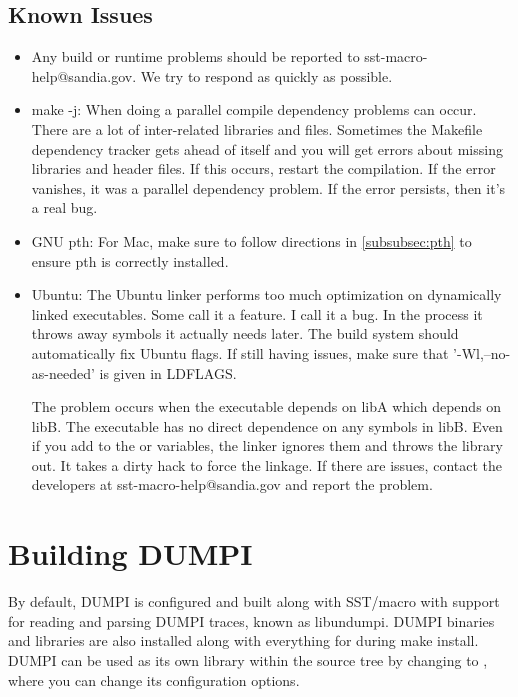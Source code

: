 \subsection{Known Issues}
\label{subsec:build:issues}


\begin{itemize}
\item Any build or runtime problems should be reported to sst-macro-help@sandia.gov.  We try to respond as quickly as possible.
\item make -j: When doing a parallel compile dependency problems can occur.  
There are a lot of inter-related libraries and files.  
Sometimes the Makefile dependency tracker gets ahead of itself and you will get errors about missing libraries and header files.
If this occurs, restart the compilation.  If the error vanishes, it was a parallel dependency problem.
If the error persists, then it's a real bug.
\item GNU pth: For Mac, make sure to follow directions in \ref{subsubsec:pth} to ensure pth is correctly installed.
\item Ubuntu: The Ubuntu linker performs too much optimization on dynamically linked executables.
Some call it a feature.  I call it a bug.
In the process it throws away symbols it actually needs later. The build system should automatically fix Ubuntu flags.
If still having issues, make sure that '-Wl,--no-as-needed' is given in LDFLAGS.

The problem occurs when the executable depends on libA which depends on libB.
The executable has no direct dependence on any symbols in libB.
Even if you add  to the  or  variables,
the linker ignores them and throws the library out.
It takes a dirty hack to force the linkage.
If there are issues, contact the developers at sst-macro-help@sandia.gov and report the problem. 
\end{itemize}

\section{Building DUMPI}
\label{sec:building:dumpi}

By default, DUMPI is configured and built along with SST/macro with support for reading and parsing DUMPI traces, known as libundumpi.  
DUMPI binaries and libraries are also installed along with everything for \sstmacro during make install.   
DUMPI can be used as its own library within the \sstmacro source tree by changing to , 
where you can change its configuration options.  

